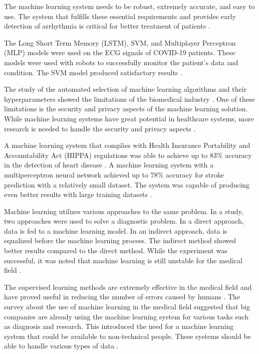 \documentclass[a4paper,fleqn]{cas-dc}
\begin{document}
The machine learning system needs to be robust, extremely accurate, and easy to use. The system that fulfills these essential requirements and provides early detection of arrhythmia is critical for better treatment of patients \cite{ref_paper_4}.

The Long Short Term Memory (LSTM), SVM, and Multiplayer Perceptron (MLP) models were used on the ECG signals of COVID-19 patients. These models were used with robots to successfully monitor the patient's data and condition. The SVM model produced satisfactory results \cite{ref_paper_40}.

The study of the automated selection of machine learning algorithms and their hyperparameters showed the limitations of the biomedical industry \cite{ref_paper_32}. One of these limitations is the security and privacy aspects of the machine learning solution. While machine learning systems have great potential in healthcare systems, more research is needed to handle the security and privacy aspects \cite{ref_paper_37}.

A machine learning system that complies with Health Insurance Portability and Accountability Act (HIPPA) regulations was able to achieve up to 83\% accuracy in the detection of heart disease \cite{ref_paper_41}. A machine learning system with a multiperceptron neural network achieved up to 78\% accuracy for stroke prediction with a relatively small dataset. The system was capable of producing even better results with large training datasets \cite{ref_paper_42}.

Machine learning utilizes various approaches to the same problem. In a study, two approaches were used to solve a diagnostic problem. In a direct approach, data is fed to a machine learning model. In an indirect approach, data is equalized before the machine learning process. The indirect method showed better results compared to the direct method. While the experiment was successful, it was noted that machine learning is still unstable for the medical field \cite{ref_paper_8}.

The supervised learning methods are extremely effective in the medical field and have proved useful in reducing the number of errors caused by humans \cite{ref_paper_11}. The survey about the use of machine learning in the medical field suggested that big companies are already using the machine learning system for various tasks such as diagnosis and research. This introduced the need for a machine learning system that could be available to non-technical people. These systems should be able to handle various types of data \cite{ref_paper_33}.
\end{document}
